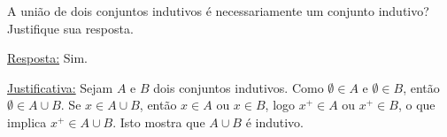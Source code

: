 \begin{exercicio}
	A união de dois conjuntos indutivos é necessariamente um conjunto indutivo? Justifique sua resposta.
\end{exercicio}
\begin{solucao}
	
	\underline{Resposta:} Sim.
	
	\underline{Justificativa:} Sejam $A$ e $B$ dois conjuntos indutivos. Como $\emptyset\in A$ e $\emptyset\in B$, então $\emptyset\in A\cup B$. Se $x\in A\cup B$, então $x\in A$ ou $x\in B$, logo $x^+\in A$ ou $x^+\in B$, o que implica $x^+\in A\cup B$. Isto mostra que $A\cup B$ é indutivo.
\end{solucao}